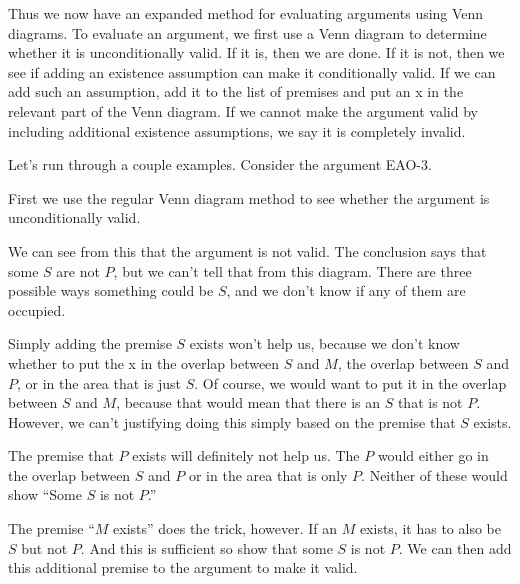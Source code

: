 Thus we now have an expanded method for evaluating arguments using Venn diagrams. To evaluate an argument, we first use a Venn diagram to determine whether it is unconditionally valid. If it is, then we are done. If it is not, then we see if adding an existence assumption can make it conditionally valid. If we can add such an assumption, add it to the list of premises and put an x in the relevant part of the Venn diagram. If we cannot make the argument valid by including additional existence assumptions, we say it is completely invalid.

Let's run through a couple examples. Consider the argument EAO-3.

\begin{kormanize}
\end{kormanize}

First we use the regular Venn diagram method to see whether the argument is unconditionally valid.






We can see from this that the argument is not valid. The conclusion says that some $S$ are not $P$, but we can't tell that from this diagram. There are three possible ways something could be $S$, and we don't know if any of them are occupied.

Simply adding the premise $S$ exists won't help us, because we don't know whether to put the x in the overlap between $S$ and $M$, the overlap between $S$ and $P$, or in the area that is just $S$. Of course, we would want to put it in the overlap between $S$ and $M$, because that would mean that there is an $S$ that is not $P$. However, we can't justifying doing this simply based on the premise that $S$ exists.

The premise that $P$ exists will definitely not help us. The $P$ would either go in the overlap between $S$ and $P$ or in the area that is only $P$. Neither of these would show ``Some $S$ is not $P$.''

The premise ``$M$ exists'' does the trick, however. If an $M$ exists, it has to also be $S$ but not $P$. And this is sufficient so show that some $S$ is not $P$. We can then add this additional premise to the argument to make it valid.

\begin{kormanize}
\end{kormanize}

